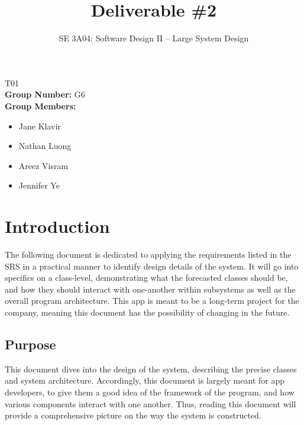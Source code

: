 \documentclass[]{article}
\title{Deliverable \#2}
\author{SE 3A04: Software Design II -- Large System Design}
\date{}
\begin{document}
\maketitle	
{} T01\\
{\bf Group Number:} G6 \\
{\bf Group Members:} 
\begin{itemize}
	\item Jane Klavir
	\item Nathan Luong
	\item Areez Visram
	\item Jennifer Ye
\end{itemize}

\section{Introduction}
\label{sec:introduction}

The following document is dedicated to applying the requirements listed in the SRS in a practical manner to identify design details of the system. It will go into specifics on a class-level, demonstrating what the forecasted classes should be, and how they should interact with one-another within subsystems as well as the overall program architecture. This app is meant to be a long-term project for the company, meaning this document has the possibility of changing in the future.

\subsection{Purpose}
\label{sub:purpose}
This document dives into the design of the system, describing the precise classes and system architecture. Accordingly, this document is largely meant for app developers, to give them a good idea of the framework of the program, and how various components interact with one another. Thus, reading this document will provide a comprehensive picture on the way the system is constructed.
\end{document}

